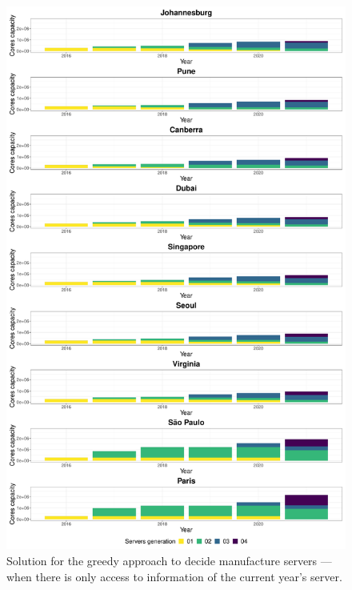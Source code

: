 \begin{figure}[ht]
\centering  
  \includegraphics[width=\linewidth]{images/dc_evolution_year_by_year.pdf}
  \caption{Solution for the greedy approach to decide manufacture servers --- when there is only access to information of the current year's server.}
  \label{fig:dc_evolution_year_by_year}
\end{figure}

